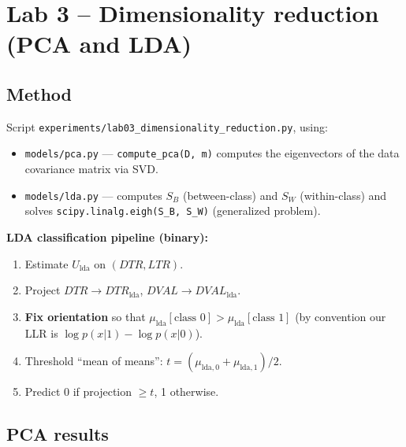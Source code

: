 \documentclass[11pt,a4paper]{article}
\begin{document}
\section{Lab 3 -- Dimensionality reduction (PCA and LDA)}\label{sec:lab3}

\subsection{Method}

Script \texttt{experiments/lab03\_dimensionality\_reduction.py}, using:
\begin{itemize}
\item \texttt{models/pca.py} --- \texttt{compute\_pca(D, m)} computes
      the eigenvectors of the data covariance matrix via SVD.
\item \texttt{models/lda.py} --- computes $S_B$ (between-class) and
      $S_W$ (within-class) and solves
      \texttt{scipy.linalg.eigh(S\_B, S\_W)} (generalized problem).
\end{itemize}

\textbf{LDA classification pipeline (binary):}
\begin{enumerate}
\item Estimate $U_{\textrm{lda}}$ on $(\mathit{DTR}, \mathit{LTR})$.
\item Project $\mathit{DTR} \rightarrow \mathit{DTR}_{\textrm{lda}}$,
      $\mathit{DVAL} \rightarrow \mathit{DVAL}_{\textrm{lda}}$.
\item \textbf{Fix orientation} so that
      $\mu_{\textrm{lda}}[\textrm{class }0] > \mu_{\textrm{lda}}[\textrm{class }1]$
      (by convention our LLR is $\log p(x|1) - \log p(x|0)$).
\item Threshold ``mean of means'':
      $t = (\mu_{\textrm{lda},0} + \mu_{\textrm{lda},1})/2$.
\item Predict 0 if projection $\geq t$, 1 otherwise.
\end{enumerate}

\subsection{PCA results}
\end{document}
